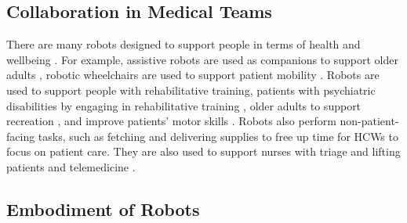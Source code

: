 \subsection{Collaboration in Medical Teams}

There are many robots designed to support people in terms of health and wellbeing \cite{kyrarini2021survey,riek2017healthcare}.
For example, assistive robots are used as companions to support older adults \cite{yang2017companion}, robotic wheelchairs are used to support patient mobility \cite{ktistakis2017assistive,jiang2016enhanced}. 
Robots are used to support people with rehabilitative training, patients with psychiatric disabilities by engaging in rehabilitative training \cite{sato2020rehabilitation}, older adults to support recreation  \cite{carros2020exploring}, and improve patients' motor skills \cite{wu2016design}.
Robots also perform non-patient-facing tasks, such as fetching and delivering supplies \cite{ahn2015healthcare,taylor2019coordinating,taylor2021social} to free up time for HCWs to focus on patient care. 
They are also used to support nurses with triage \cite{ahn2015healthcare} and lifting patients \cite{lee2014design} and telemedicine \cite{matsumoto2023robot}.%






\subsection{Embodiment of Robots}

